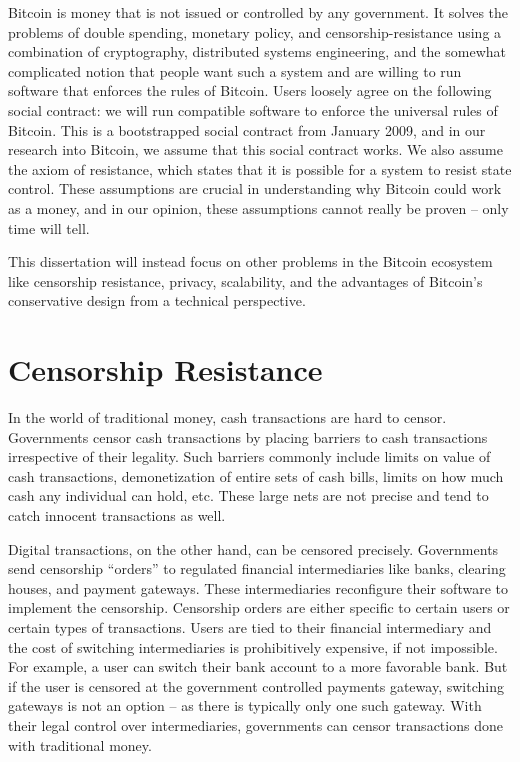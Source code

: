 Bitcoin is money that is not issued or controlled by any government. It solves the problems of double spending, monetary policy, and censorship-resistance using a combination of cryptography, distributed systems engineering, and the somewhat complicated notion that people want such a system and are willing to run software that enforces the rules of Bitcoin. Users loosely agree on the following social contract: we will run compatible software to enforce the universal rules of Bitcoin. This is a bootstrapped social contract from January 2009, and in our research into Bitcoin, we assume that this social contract works. We also assume the axiom of resistance\cite{axiom_of_resistance}, which states that it is possible for a system to resist state control. These assumptions are crucial in understanding why Bitcoin could work as a money, and in our opinion, these assumptions cannot really be proven -- only time will tell.

This dissertation will instead focus on other problems in the Bitcoin ecosystem like censorship resistance, privacy, scalability, and the advantages of Bitcoin's conservative design from a technical perspective.

\section{Censorship Resistance}
In the world of traditional money, cash transactions are hard to censor. Governments censor cash transactions by placing barriers to cash transactions irrespective of their legality. Such barriers commonly include limits on value of cash transactions, demonetization of entire sets of cash bills, limits on how much cash any individual can hold, etc. These large nets are not precise and tend to catch innocent transactions as well.

Digital transactions, on the other hand, can be censored precisely. Governments send censorship ``orders'' to regulated financial intermediaries like banks, clearing houses, and payment gateways. These intermediaries reconfigure their software to implement the censorship. Censorship orders are either specific to certain users or certain types of transactions. Users are tied to their financial intermediary and the cost of switching intermediaries is prohibitively expensive, if not impossible. For example, a user can switch their bank account to a more favorable bank. But if the user is censored at the government controlled payments gateway, switching gateways is not an option -- as there is typically only one such gateway. With their legal control over intermediaries, governments can censor transactions done with traditional money.

